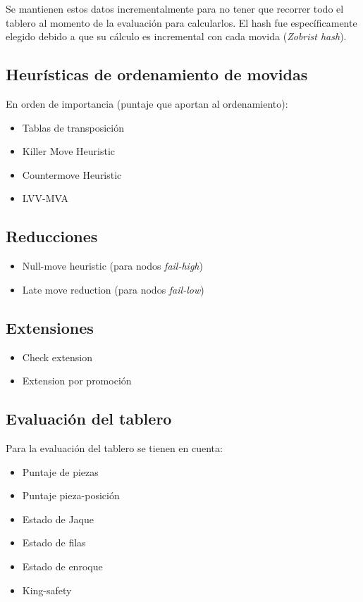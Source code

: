 \documentclass{article}
\begin{document}
Se mantienen estos datos incrementalmente para no tener que recorrer
todo el tablero al momento de la evaluación para calcularlos. El hash
fue específicamente elegido debido a que su cálculo es incremental con
cada movida (\emph{Zobrist hash}).

\subsection{Heurísticas de ordenamiento de movidas}
En orden de importancia (puntaje que aportan al ordenamiento):
\begin{itemize}
\item Tablas de transposición
\item Killer Move Heuristic
\item Countermove Heuristic
\item LVV-MVA
\end{itemize}

\subsection{Reducciones}

\begin{itemize}
\item Null-move heuristic (para nodos \emph{fail-high})
\item Late move reduction (para nodos \emph{fail-low})
\end{itemize}

\subsection{Extensiones}
\begin{itemize}
\item Check extension
\item Extension por promoción
\end{itemize}

\subsection{Evaluación del tablero}
Para la evaluación del tablero se tienen en cuenta:
\begin{itemize}
\item Puntaje de piezas
\item Puntaje pieza-posición
\item Estado de Jaque
\item Estado de filas
\item Estado de enroque
\item King-safety
\end{itemize}
\end{document}
